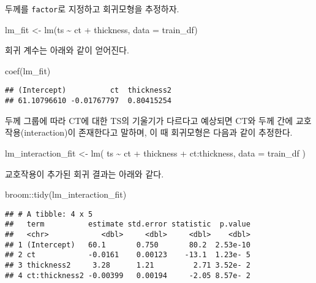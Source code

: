\documentclass[
]{book}
\newenvironment{Shaded}{\begin{snugshade}}{\end{snugshade}}
\newcommand{\AttributeTok}[1]{\textcolor[rgb]{0.77,0.63,0.00}{#1}}
\newcommand{\FunctionTok}[1]{\textcolor[rgb]{0.00,0.00,0.00}{#1}}
\newcommand{\NormalTok}[1]{#1}
\newcommand{\OtherTok}[1]{\textcolor[rgb]{0.56,0.35,0.01}{#1}}
\newcommand{\SpecialCharTok}[1]{\textcolor[rgb]{0.00,0.00,0.00}{#1}}
\begin{document}
두께를 \texttt{factor}로 지정하고 회귀모형을 추정하자.

\begin{Shaded}
\begin{Highlighting}[]
\NormalTok{lm\_fit }\OtherTok{\textless{}{-}} \FunctionTok{lm}\NormalTok{(ts }\SpecialCharTok{\textasciitilde{}}\NormalTok{ ct }\SpecialCharTok{+}\NormalTok{ thickness, }\AttributeTok{data =}\NormalTok{ train\_df)}
\end{Highlighting}
\end{Shaded}

회귀 계수는 아래와 같이 얻어진다.

\begin{Shaded}
\begin{Highlighting}[]
\FunctionTok{coef}\NormalTok{(lm\_fit)}
\end{Highlighting}
\end{Shaded}

\begin{verbatim}
## (Intercept)          ct  thickness2 
## 61.10796610 -0.01767797  0.80415254
\end{verbatim}

두께 그룹에 따라 CT에 대한 TS의 기울기가 다르다고 예상되면 CT와 두께 간에 교호작용(interaction)이 존재한다고 말하며, 이 때 회귀모형은 다음과 같이 추정한다.

\begin{Shaded}
\begin{Highlighting}[]
\NormalTok{lm\_interaction\_fit }\OtherTok{\textless{}{-}} \FunctionTok{lm}\NormalTok{(}
\NormalTok{  ts }\SpecialCharTok{\textasciitilde{}}\NormalTok{ ct }\SpecialCharTok{+}\NormalTok{ thickness }\SpecialCharTok{+}\NormalTok{ ct}\SpecialCharTok{:}\NormalTok{thickness, }
  \AttributeTok{data =}\NormalTok{ train\_df}
\NormalTok{)}
\end{Highlighting}
\end{Shaded}

교호작용이 추가된 회귀 결과는 아래와 같다.

\begin{Shaded}
\begin{Highlighting}[]
\NormalTok{broom}\SpecialCharTok{::}\FunctionTok{tidy}\NormalTok{(lm\_interaction\_fit)}
\end{Highlighting}
\end{Shaded}

\begin{verbatim}
## # A tibble: 4 x 5
##   term          estimate std.error statistic  p.value
##   <chr>            <dbl>     <dbl>     <dbl>    <dbl>
## 1 (Intercept)   60.1       0.750       80.2  2.53e-10
## 2 ct            -0.0161    0.00123    -13.1  1.23e- 5
## 3 thickness2     3.28      1.21         2.71 3.52e- 2
## 4 ct:thickness2 -0.00399   0.00194     -2.05 8.57e- 2
\end{verbatim}
\end{document}
